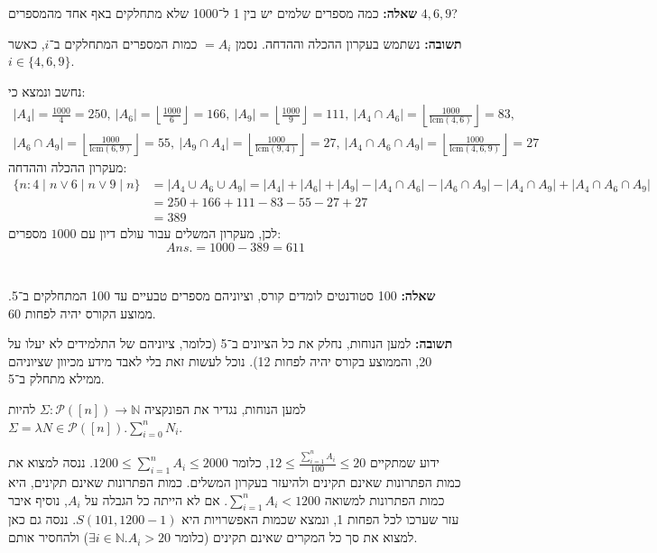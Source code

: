 \documentclass[]{article}
\newcommand\N     {\mathbb{N}}
\newcommand\ps    {\mathcal{P}}
\newcommand\ans   {\mathit{Ans.}}
\newcommand\rf    {\right\rfloor}
\newcommand\lf    {\left\lfloor}
\newcommand\mlcm  {\mathrm{lcm}}
\newcommand\sumni     {\sum_{i = 0}^{n}}
\newcommand\sumai     {\sum_{i = 1}^{n} A_i}
\begin{document}
	\section{} %
	\textbf{שאלה: }כמה מספרים שלמים יש בין 1 ל־1000 שלא מתחלקים באף אחד מהמספרים $ 4, 6, 9 $?
	
	\textbf{תשובה: }נשתמש בעקרון ההכלה וההדחה. נסמן $= A_i$ כמות המספרים המתחלקים ב־$i$, כאשר $i \in \{4, 6, 9\}$. 
	
	נחשב ונמצא כי: 
	\begin{gather}
		|A_4| = \frac{1000}{4} = 250, \ |A_6| = \lf \frac{1000}{6} \rf = 166, \ |A_9| = \lf \frac{1000}{9} \rf = 111, \ |A_4 \cap A_6| = \lf \frac{1000}{\mlcm(4, 6)} \rf = 83, \\
		|A_6 \cap A_9| = \lf \frac{1000}{\mlcm(6, 9)} \rf = 55, \ |A_9 \cap A_4| = \lf \frac{1000}{\mlcm(9, 4)} \rf = 27, \ |A_4 \cap A_6 \cap A_9| = \lf \frac{1000}{\mlcm(4, 6, 9)} \rf = 27
	\end{gather}
	מעקרון ההכלה וההדחה: 
	\begin{align}
		\{n \colon 4 \mid n \lor 6 \mid n \lor 9 \mid n \} &= |A_4 \cup A_6 \cup A_9| = |A_4| + |A_6| + |A_9| - |A_4 \cap A_6| - |A_6 \cap A_9| - |A_4 \cap A_9| + |A_4 \cap A_6 \cap A_9| \\
		&= 250 + 166 + 111 - 83 - 55 - 27 + 27 \\
		&= 389
	\end{align}
	לכן, מעקרון המשלים עבור עולם דיון עם $1000$ מספרים: 
	\[ \ans = 1000 - 389 = 611 \]
	
	\section{} %
	\textbf{שאלה: }100 סטודנטים לומדים קורס, וציוניהם מספרים טבעיים עד 100 המתחלקים ב־5. ממוצע הקורס יהיה לפחות 60. 
	
	\textbf{תשובה: }למען הנוחות, נחלק את כל הציונים ב־5 (כלומר, ציוניהם של התלמידים לא יעלו על 20, והממוצע בקורס יהיה לפחות 12). נוכל לעשות זאת בלי לאבד מידע מכיוון שציוניהם ממילא מתחלק ב־5. 
	
	למען הנוחות, נגדיר את הפונקציה $\Sigma \colon \ps([n]) \to \N$ להיות $\Sigma = \lambda N \in \ps([n]). \sumni N_i$. 
	
		ידוע שמתקיים $ 12 \le \frac{\sumai}{100} \le 20 $, כלומר $1200 \le \sumai \le 2000 $. ננסה למצוא את כמות הפתרונות שאינם תקינים ולהיעזר בעקרון המשלים. כמות הפתרונות שאינם תקינים, היא כמות הפתרונות למשואה $\sumai < 1200 $. אם לא הייתה כל הגבלה על $A_i$, נוסיף איבר עזר שערכו לכל הפחות 1, ונמצא שכמות האפשרויות היא $S(101, 1200 - 1)$. ננסה גם כאן למצוא את סך כל המקרים שאינם תקינים (כלומר $\exists i \in \N. A_i > 20 $) ולהחסיר אותם. 
		
\end{document}

